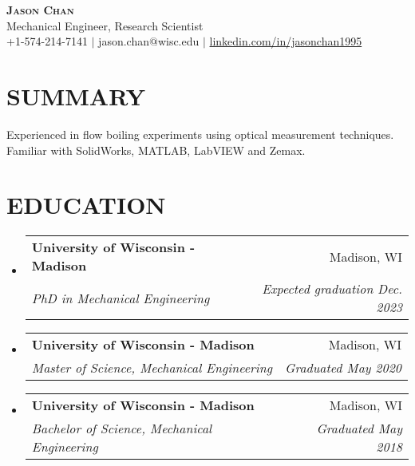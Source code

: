 \documentclass[letterpaper,11pt]{article}
\makeatletter
\newcommand{\resumeSubheading}[4]{
  \vspace{-1pt}\item
    \begin{tabular*}{0.97\textwidth}[t]{l@{\extracolsep{\fill}}r}
      \textbf{#1} & #2 \\
      \textit{\small#3} & \textit{\small #4} \\
    \end{tabular*}\vspace{-7pt}
}
\newcommand{\resumeSubHeadingListStart}{\begin{itemize}[leftmargin=0.15in, label={}]}
\newcommand{\resumeSubHeadingListEnd}{\end{itemize}}
\makeatother
\begin{document}


\begin{center}
    \textbf{\LARGE \scshape Jason Chan} \\
    \vspace{1mm}
    Mechanical Engineer, Research Scientist\\ %
    \small +1-574-214-7141  $|$ jason.chan$@$wisc.edu $|$ \href{https://www.linkedin.com/in/jasonchan1995}{linkedin.com/in/jasonchan1995}
\end{center}
\section{SUMMARY}
Experienced in flow boiling experiments using optical measurement techniques. Familiar with SolidWorks, MATLAB, LabVIEW and Zemax.


\section{EDUCATION}
    \resumeSubHeadingListStart
      \resumeSubheading
       {University of Wisconsin - Madison}{Madison, WI}
       {PhD in Mechanical Engineering}{Expected graduation Dec. 2023}
    
      \resumeSubheading
        {University of Wisconsin - Madison}{Madison, WI}
        {Master of Science, Mechanical Engineering}{Graduated May 2020}
      
      \resumeSubheading
        {University of Wisconsin - Madison}{Madison, WI}
        {Bachelor of Science, Mechanical Engineering}{Graduated May 2018}
\resumeSubHeadingListEnd
\end{document}
